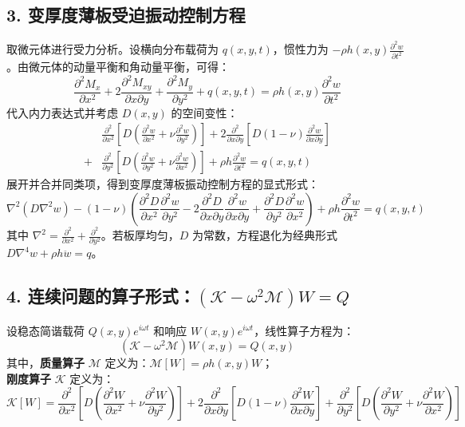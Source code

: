 \documentclass[11pt,a4paper]{article}
\begin{document}
\subsection*{3. 变厚度薄板受迫振动控制方程}
取微元体进行受力分析。设横向分布载荷为 $q(x,y,t)$，惯性力为 $-\rho h(x,y) \frac{\partial^2 w}{\partial t^2}$。由微元体的动量平衡和角动量平衡，可得：
\begin{equation}
    \frac{\partial^2 M_x}{\partial x^2} + 2\frac{\partial^2 M_{xy}}{\partial x \partial y} + \frac{\partial^2 M_y}{\partial y^2} + q(x,y,t) = \rho h(x,y) \frac{\partial^2 w}{\partial t^2}
\end{equation}
代入内力表达式并考虑 $D(x,y)$ 的空间变性：
\begin{equation}
\begin{aligned} 
    & \frac{\partial^2}{\partial x^2} \left[ D \left( \frac{\partial^2 w}{\partial x^2} + \nu \frac{\partial^2 w}{\partial y^2} \right) \right] + 2 \frac{\partial^2}{\partial x \partial y} \left[ D (1-\nu) \frac{\partial^2 w}{\partial x \partial y} \right] \\
    + & \frac{\partial^2}{\partial y^2} \left[ D \left( \frac{\partial^2 w}{\partial y^2} + \nu \frac{\partial^2 w}{\partial x^2} \right) \right] + \rho h \frac{\partial^2 w}{\partial t^2} = q(x,y,t) 
\end{aligned}
\end{equation}
展开并合并同类项，得到变厚度薄板振动控制方程的显式形式：
\begin{equation}
    \nabla^2 \left( D \nabla^2 w \right) - (1-\nu) \left( \frac{\partial^2 D}{\partial x^2}\frac{\partial^2 w}{\partial y^2} - 2\frac{\partial^2 D}{\partial x \partial y}\frac{\partial^2 w}{\partial x \partial y} + \frac{\partial^2 D}{\partial y^2}\frac{\partial^2 w}{\partial x^2} \right) + \rho h \frac{\partial^2 w}{\partial t^2} = q(x,y,t)
\end{equation}
其中 $\nabla^2 = \frac{\partial^2}{\partial x^2} + \frac{\partial^2}{\partial y^2}$。若板厚均匀，$D$ 为常数，方程退化为经典形式 $D\nabla^4 w + \rho h \ddot{w} = q$。

\subsection*{4. 连续问题的算子形式：$(\mathcal{K} - \omega^2 \mathcal{M})W = Q$}
设稳态简谐载荷 $Q(x,y)e^{i\omega t}$ 和响应 $W(x,y)e^{i\omega t}$，线性算子方程为：
\begin{equation}
    (\mathcal{K} - \omega^2 \mathcal{M}) W(x,y) = Q(x,y)
\end{equation}
其中，\textbf{质量算子} $\mathcal{M}$ 定义为：$\mathcal{M}[W] = \rho h(x,y) W$；\\
\textbf{刚度算子} $\mathcal{K}$ 定义为：
\begin{equation}
    \mathcal{K}[W] = \frac{\partial^2}{\partial x^2} \left[ D \left( \frac{\partial^2 W}{\partial x^2} + \nu \frac{\partial^2 W}{\partial y^2} \right) \right] + 2 \frac{\partial^2}{\partial x \partial y} \left[ D (1-\nu) \frac{\partial^2 W}{\partial x \partial y} \right] + \frac{\partial^2}{\partial y^2} \left[ D \left( \frac{\partial^2 W}{\partial y^2} + \nu \frac{\partial^2 W}{\partial x^2} \right) \right]
\end{equation}
\end{document}
